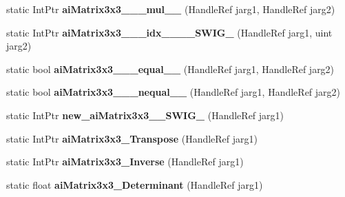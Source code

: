 \begin{DoxyCompactItemize}
\item 
\hypertarget{class_assimp_p_i_n_v_o_k_e_a44d1d9af049f5dc2144e7ddfe0c20926}{static Int\+Ptr {\bfseries ai\+Matrix3x3\+\_\+\+\_\+\+\_\+mul\+\_\+\+\_\+} (Handle\+Ref jarg1, Handle\+Ref jarg2)}\label{class_assimp_p_i_n_v_o_k_e_a44d1d9af049f5dc2144e7ddfe0c20926}

\item 
\hypertarget{class_assimp_p_i_n_v_o_k_e_a61a18ea2f1472510cacf1edc71db1e70}{static Int\+Ptr {\bfseries ai\+Matrix3x3\+\_\+\+\_\+\+\_\+idx\+\_\+\+\_\+\+\_\+\+\_\+\+S\+W\+I\+G\+\_} (Handle\+Ref jarg1, uint jarg2)}\label{class_assimp_p_i_n_v_o_k_e_a61a18ea2f1472510cacf1edc71db1e70}

\item 
\hypertarget{class_assimp_p_i_n_v_o_k_e_a05c25c87d0b3c4e691315a9084b48bfd}{static bool {\bfseries ai\+Matrix3x3\+\_\+\+\_\+\+\_\+equal\+\_\+\+\_\+} (Handle\+Ref jarg1, Handle\+Ref jarg2)}\label{class_assimp_p_i_n_v_o_k_e_a05c25c87d0b3c4e691315a9084b48bfd}

\item 
\hypertarget{class_assimp_p_i_n_v_o_k_e_a03e771a581206c0e6be83d1da30417c3}{static bool {\bfseries ai\+Matrix3x3\+\_\+\+\_\+\+\_\+nequal\+\_\+\+\_\+} (Handle\+Ref jarg1, Handle\+Ref jarg2)}\label{class_assimp_p_i_n_v_o_k_e_a03e771a581206c0e6be83d1da30417c3}

\item 
\hypertarget{class_assimp_p_i_n_v_o_k_e_ab4cfa8de94fe611ef77c1ca83f1d52fb}{static Int\+Ptr {\bfseries new\+\_\+ai\+Matrix3x3\+\_\+\+\_\+\+S\+W\+I\+G\+\_} (Handle\+Ref jarg1)}\label{class_assimp_p_i_n_v_o_k_e_ab4cfa8de94fe611ef77c1ca83f1d52fb}

\item 
\hypertarget{class_assimp_p_i_n_v_o_k_e_acfff2678ec226d68af0751b68e608d28}{static Int\+Ptr {\bfseries ai\+Matrix3x3\+\_\+\+Transpose} (Handle\+Ref jarg1)}\label{class_assimp_p_i_n_v_o_k_e_acfff2678ec226d68af0751b68e608d28}

\item 
\hypertarget{class_assimp_p_i_n_v_o_k_e_a6d9acc72dcf7366a80f951ba428693c1}{static Int\+Ptr {\bfseries ai\+Matrix3x3\+\_\+\+Inverse} (Handle\+Ref jarg1)}\label{class_assimp_p_i_n_v_o_k_e_a6d9acc72dcf7366a80f951ba428693c1}

\item 
\hypertarget{class_assimp_p_i_n_v_o_k_e_a8c5e9e77eea6d41ff27e453b484d8b6b}{static float {\bfseries ai\+Matrix3x3\+\_\+\+Determinant} (Handle\+Ref jarg1)}\label{class_assimp_p_i_n_v_o_k_e_a8c5e9e77eea6d41ff27e453b484d8b6b}


\end{DoxyCompactItemize}
